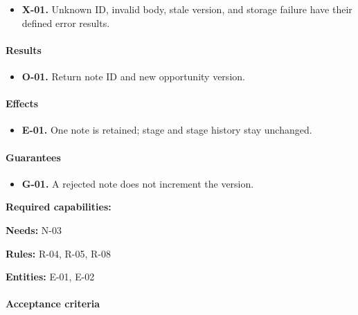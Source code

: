 \documentclass[10pt,a4paper]{article}
\begin{document}
\begin{itemize}

\item \textbf{X-01.} Unknown ID, invalid body, stale version, and storage failure have their defined error results.

\end{itemize}

\paragraph{Results}

\begin{itemize}

\item \textbf{O-01.} Return note ID and new opportunity version.

\end{itemize}

\paragraph{Effects}

\begin{itemize}

\item \textbf{E-01.} One note is retained; stage and stage history stay unchanged.

\end{itemize}

\paragraph{Guarantees}

\begin{itemize}

\item \textbf{G-01.} A rejected note does not increment the version.

\end{itemize}

\textbf{Required capabilities:}

\textbf{Needs:} N-03

\textbf{Rules:} R-04, R-05, R-08

\textbf{Entities:} E-01, E-02

\paragraph{Acceptance criteria}
\end{document}
